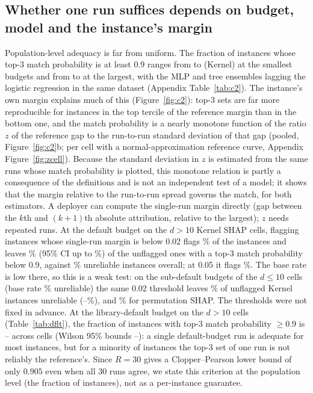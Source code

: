 \subsection{Whether one run suffices depends on budget, model and the instance's margin}
Population-level adequacy is far from uniform. The fraction of instances whose top-3 match probability is at least $0.9$ ranges from \numadeqSmallKLo{} to \numadeqSmallKHi{} (Kernel) at the smallest budgets and from \numadeqLargeKLo{} to \numadeqLargeKHi{} at the largest, with the MLP and tree ensembles lagging the logistic regression in the same dataset (Appendix Table~\ref{tab:c2}). The instance's own margin explains much of this (Figure~\ref{fig:c2}): top-3 sets are far more reproducible for instances in the top tercile of the reference margin than in the bottom one, and the match probability is a nearly monotone function of the ratio $z$ of the reference gap to the run-to-run standard deviation of that gap (pooled, Figure~\ref{fig:c2}b; per cell with a normal-approximation reference curve, Appendix Figure~\ref{fig:zcell}). Because the standard deviation in $z$ is estimated from the same runs whose match probability is plotted, this monotone relation is partly a consequence of the definitions and is not an independent test of a model; it shows that the margin relative to the run-to-run spread governs the match, for both estimators. A deployer can compute the single-run margin directly (gap between the $k$th and $(k{+}1)$th absolute attribution, relative to the largest); $z$ needs repeated runs. At the default budget on the $d>10$ Kernel SHAP cells, flagging instances whose single-run margin is below 0.02 flags \numosDKLowFlag{}\% of the \numosDKLowN{} instances and leaves \numosDKLowFA{}\% (95\% CI up to \numosDKLowFAHi{}\%) of the unflagged ones with a top-3 match probability below 0.9, against \numosDKLowUnrel{}\% unreliable instances overall; at 0.05 it flags \numosDKMidFlag{}\%. The base rate is low there, so this is a weak test: on the sub-default budgets of the $d\le10$ cells (base rate \numosSKLowUnrel{}\% unreliable) the same 0.02 threshold leaves \numosSKLowFA{}\% of unflagged Kernel instances unreliable (\numosSKLowFALo{}--\numosSKLowFAHi{}\%), and \numosSPLowFA{}\% for permutation SHAP. The thresholds were not fixed in advance.
At the library-default budget on the $d>10$ cells (Table~\ref{tab:dflt}), the fraction of instances with top-3 match probability $\ge0.9$ is \numdfltAdeqLo{}--\numdfltAdeqHi{} across cells (Wilson 95\% bounds \numdfltAdeqLoCILo{}--\numdfltAdeqHiCIHi{}): a single default-budget run is adequate for most instances, but for a minority of instances the top-3 set of one run is not reliably the reference's. Since $R=30$ gives a Clopper--Pearson lower bound of only $0.905$ even when all 30 runs agree, we state this criterion at the population level (the fraction of instances), not as a per-instance guarantee.

